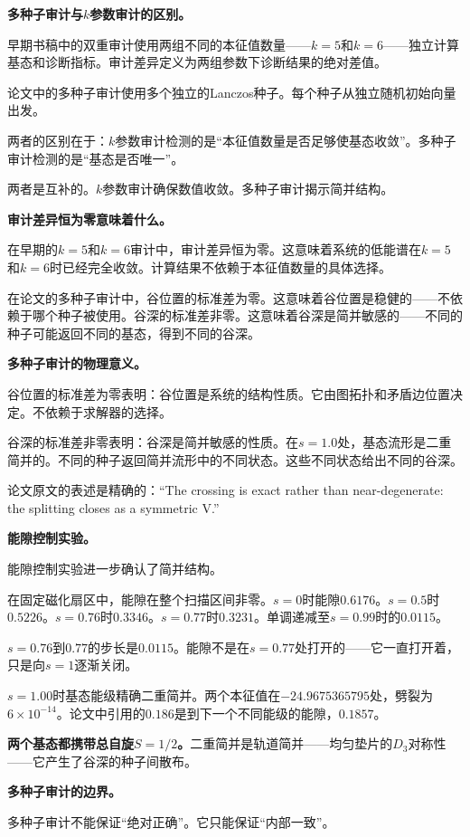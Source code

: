 \documentclass[11pt,a4paper]{book}
\theoremstyle{definition}
\begin{document}
\textbf{多种子审计与$k$参数审计的区别。}

早期书稿中的双重审计使用两组不同的本征值数量——$k=5$和$k=6$——独立计算基态和诊断指标。审计差异定义为两组参数下诊断结果的绝对差值。

论文中的多种子审计使用多个独立的Lanczos种子。每个种子从独立随机初始向量出发。

两者的区别在于：$k$参数审计检测的是“本征值数量是否足够使基态收敛”。多种子审计检测的是“基态是否唯一”。

两者是互补的。$k$参数审计确保数值收敛。多种子审计揭示简并结构。

\textbf{审计差异恒为零意味着什么。}

在早期的$k=5$和$k=6$审计中，审计差异恒为零。这意味着系统的低能谱在$k=5$和$k=6$时已经完全收敛。计算结果不依赖于本征值数量的具体选择。

在论文的多种子审计中，谷位置的标准差为零。这意味着谷位置是稳健的——不依赖于哪个种子被使用。谷深的标准差非零。这意味着谷深是简并敏感的——不同的种子可能返回不同的基态，得到不同的谷深。

\textbf{多种子审计的物理意义。}

谷位置的标准差为零表明：谷位置是系统的结构性质。它由图拓扑和矛盾边位置决定。不依赖于求解器的选择。

谷深的标准差非零表明：谷深是简并敏感的性质。在$s=1.0$处，基态流形是二重简并的。不同的种子返回简并流形中的不同状态。这些不同状态给出不同的谷深。

论文原文的表述是精确的：“The crossing is exact rather than near-degenerate: the splitting closes as a symmetric V.”

\textbf{能隙控制实验。}

能隙控制实验进一步确认了简并结构。

在固定磁化扇区中，能隙在整个扫描区间非零。$s=0$时能隙$0.6176$。$s=0.5$时$0.5226$。$s=0.76$时$0.3346$。$s=0.77$时$0.3231$。单调递减至$s=0.99$时的$0.0115$。

$s=0.76$到$0.77$的步长是$0.0115$。能隙不是在$s=0.77$处打开的——它一直打开着，只是向$s=1$逐渐关闭。

$s=1.00$时基态能级精确二重简并。两个本征值在$-24.9675365795$处，劈裂为$6\times10^{-14}$。论文中引用的$0.186$是到下一个不同能级的能隙，$0.1857$。

\textbf{两个基态都携带总自旋$S=1/2$。}二重简并是轨道简并——均匀垫片的$D_3$对称性——它产生了谷深的种子间散布。

\textbf{多种子审计的边界。}

多种子审计不能保证“绝对正确”。它只能保证“内部一致”。
\end{document}
